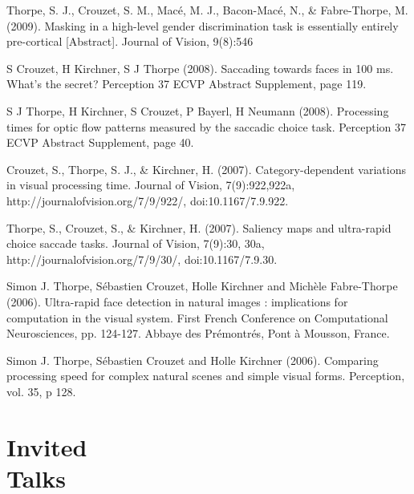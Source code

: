 \documentclass[margin,line]{resume}
\begin{document}
\begin{resume}
\vspace{-2mm} Thorpe, S. J., Crouzet, S. M., Macé, M. J., Bacon-Macé, N., \& Fabre-Thorpe, M. (2009). Masking in a high-level gender discrimination task is essentially entirely pre-cortical [Abstract]. Journal of Vision, 9(8):546

\vspace{-2mm} S Crouzet, H Kirchner, S J Thorpe (2008). Saccading towards faces in 100 ms. What's the secret? Perception 37 ECVP Abstract Supplement, page 119. 

\vspace{-2mm} S J Thorpe, H Kirchner, S Crouzet, P Bayerl, H Neumann (2008). Processing times for optic flow patterns measured by the saccadic choice task. Perception 37 ECVP Abstract Supplement, page 40.

\vspace{-2mm} Crouzet, S., Thorpe, S. J., \& Kirchner, H. (2007). Category-dependent variations in visual processing time. Journal of Vision, 7(9):922,922a, http://journalofvision.org/7/9/922/, doi:10.1167/7.9.922.

\vspace{-2mm} Thorpe, S., Crouzet, S., \& Kirchner, H. (2007). Saliency maps and ultra-rapid choice saccade tasks. Journal of Vision, 7(9):30, 30a, http://journalofvision.org/7/9/30/, doi:10.1167/7.9.30.

\vspace{-2mm} Simon J. Thorpe, Sébastien Crouzet, Holle Kirchner and Michèle Fabre-Thorpe (2006). Ultra-rapid face detection in natural images : implications for computation in the visual system. First French Conference on Computational Neurosciences, pp. 124-127. Abbaye des Prémontrés, Pont à Mousson, France.

\vspace{-2mm} Simon J. Thorpe, Sébastien Crouzet and Holle Kirchner (2006). Comparing processing speed for complex natural scenes and simple visual forms. Perception, vol. 35, p 128.

\normalsize


    \section{\mysidestyle Invited\\Talks}
    
\footnotesize %


\end{resume}
\end{document}
